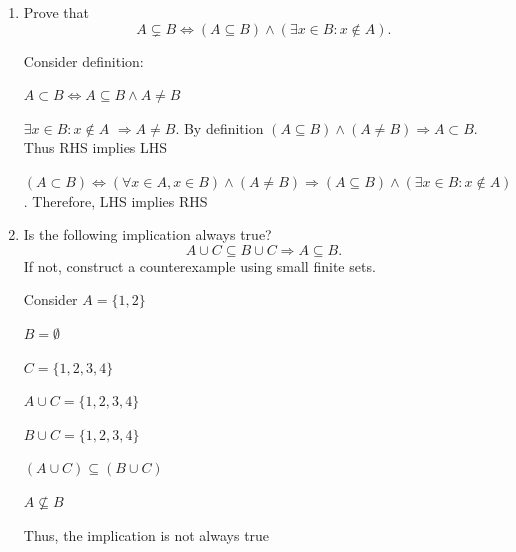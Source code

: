 \documentclass[12pt]{article}
\begin{document}
\begin{enumerate}
\begin{enumerate}
    Since $A \subseteq B$, $\forall x \in A, x \in B$. Since $B \subseteq C, \forall x \in B, x \in C$. Thus, $\forall x \in A, x \in C$. Therefore, $A \subseteq C$



    \item Prove that
    \[
    A \subsetneq B \Leftrightarrow (A \subseteq B) \land (\exists x \in B : x \notin A).
    \]

    Consider definition:

    $A \subset B \iff A \subseteq B \land A \not= B $
    
    $\exists x \in B: x \not\in A$ $\Rightarrow A \not=B$. By definition $(A \subseteq B) \land (A \not= B) \Rightarrow A \subset B$. Thus RHS implies LHS

    $(A \subset B) \iff (\forall x \in A, x \in B) \land (A \not= B) \Rightarrow (A \subseteq B) \land (\exists x \in B: x \not\in A)$. Therefore, LHS implies RHS



    \item Is the following implication always true?
    \[
    A \cup C \subseteq B \cup C \Rightarrow A \subseteq B.
    \]
    If not, construct a counterexample using small finite sets.

    Consider $A = \{1,2\}$

    $B = \emptyset$

    $C = \{1,2,3,4\}$

    $A \cup C = \{1,2,3,4\}$

    $B \cup C = \{1,2,3,4\}$

    $(A \cup C) \subseteq (B \cup C)$

    $A \not\subseteq B$

    Thus, the implication is not always true



    
    
\end{enumerate}



\end{enumerate}
\end{document}
